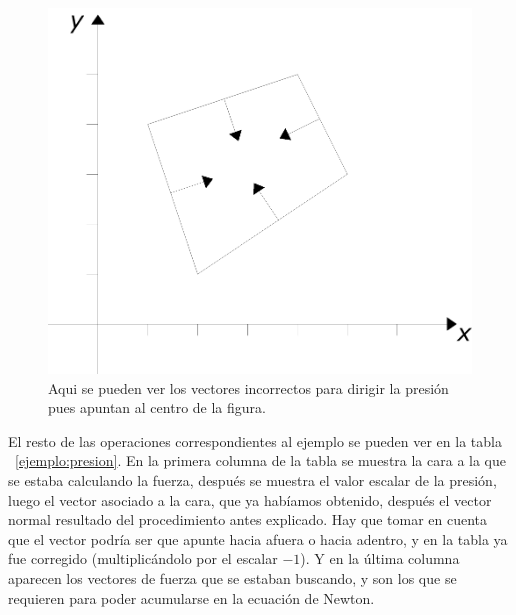 \begin{figure}
 \centering
 \includegraphics[]{Img/presion_mal}
 \caption[Vectores de presión incorrectos]{ 
 Aqui se pueden ver los vectores incorrectos para dirigir la presión pues apuntan al centro de la figura.
 } \label{presionMal:fig}
\end{figure}

El resto de las operaciones correspondientes al ejemplo se pueden ver en la tabla ~\ref{ejemplo:presion}.
En la primera columna de la tabla se muestra la cara a la que se estaba calculando la fuerza, después se muestra el valor escalar de la presión, luego el vector asociado a la cara, que ya habíamos obtenido, después el vector normal resultado del procedimiento antes explicado.
Hay que tomar en cuenta que el vector podría ser que apunte hacia afuera o hacia adentro, y en la tabla ya fue corregido (multiplicándolo por el escalar $-1$).
Y en la última columna aparecen los vectores de fuerza que se estaban buscando, y son los que se requieren para poder acumularse en la ecuación de Newton.

